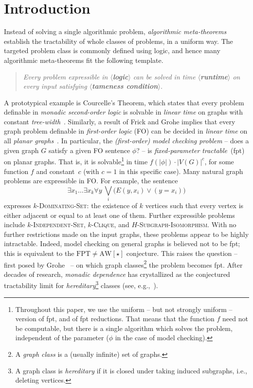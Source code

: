 \newpage
\section{Introduction}
\newcommand{\AWstar}{$\mathrm{AW}[\star]$}



Instead of solving a single algorithmic problem, \emph{algorithmic meta-theorems} 
establish the tractability of whole classes of problems, in a uniform way.
The targeted problem class is commonly defined using logic, and hence many algorithmic meta-theorems fit the following template.

\newcommand{\placeholder}[1]{\textup{\textbf{$\boldsymbol{\langle}$#1$\boldsymbol{\rangle}$}}}
\begin{quote}
\emph{Every problem expressible in \placeholder{logic} can be solved in time \placeholder{runtime} on every input satisfying \placeholder{tameness condition}.}
\end{quote}
%
A prototypical example is Courcelle's Theorem, which states that every problem definable in \emph{monadic second-order logic} is solvable in \emph{linear time} on graphs with constant \emph{tree-width}~\cite{courcelle1990monadic}.
Similarly, a result of Frick and Grohe
implies that every graph problem definable in \emph{first-order logic} (FO) can be decided in \emph{linear time} on all \emph{planar graphs}~\cite{frick2001deciding}.
In particular, the \emph{(first-order) model checking problem} 
-- does a given graph $G$ satisfy a given FO sentence $\phi$?  -- is \emph{fixed-parameter tractable}~(fpt) on planar graphs. 
That is, it is solvable\footnote{Throughout this paper, we use the uniform -- but not strongly uniform -- version of fpt, and of fpt reductions. That means that the function $f$ need not be computable, but there is a single algorithm which solves the problem, independent of the parameter ($\phi$ in the case of model checking).} in time $f(|\phi|)\cdot |V(G)|^c$, for some function $f$ and constant~$c$ (with $c=1$ in this specific case).
Many natural graph problems are expressible in FO.
For example, the sentence
\[
    \exists x_1 \ldots \exists x_k  \forall y\ 
    \bigvee_i\big(E(y,x_i) \vee (y = x_i)\big)
\]
expresses $k$-\textsc{Dominating-Set}: the existence of $k$ vertices  such that every vertex is either adjacent or equal to at least one of them.
Further expressible problems include $k$-\textsc{Independent-Set}, $k$-\textsc{Clique}, and $H$-\textsc{Subgraph-Isomorphism}.
With no further restrictions made on the input graphs,
these problems appear to be highly intractable.
Indeed, model checking on general graphs is believed not to be fpt; this is equivalent to the $\mathrm{FPT}{\neq}\mathrm{AW}[\star]$ conjecture.
This raises the question -- first posed by Grohe~\cite[Section~8.2]{logic-graphs-algorithms} -- on which graph classes\footnote{A \emph{graph class} is a (usually infinite) set of graphs.} 
the problem becomes fpt.
After decades of research, \emph{monadic dependence} has crystallized as the conjectured tractability limit for \emph{hereditary}\footnote{A graph class is \emph{hereditary} if it is closed under taking induced subgraphs, i.e., deleting vertices.} classes (see, e.g.,~\cite{warwick-problems,new-perspective-journal,tww4,ms-mc1}).


